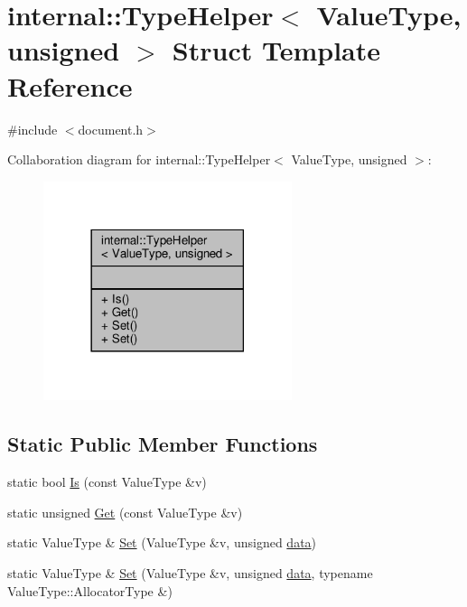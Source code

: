 \hypertarget{structinternal_1_1TypeHelper_3_01ValueType_00_01unsigned_01_4}{}\section{internal\+:\+:Type\+Helper$<$ Value\+Type, unsigned $>$ Struct Template Reference}
\label{structinternal_1_1TypeHelper_3_01ValueType_00_01unsigned_01_4}


{\ttfamily \#include $<$document.\+h$>$}



Collaboration diagram for internal\+:\+:Type\+Helper$<$ Value\+Type, unsigned $>$\+:
\nopagebreak
\begin{figure}[H]
\begin{center}
\leavevmode
\includegraphics[width=206pt]{structinternal_1_1TypeHelper_3_01ValueType_00_01unsigned_01_4__coll__graph}
\end{center}
\end{figure}
\subsection*{Static Public Member Functions}
\begin{DoxyCompactItemize}
\item 
static bool \hyperlink{structinternal_1_1TypeHelper_3_01ValueType_00_01unsigned_01_4_ad1c1cb931ed166508d17e866d410c99b}{Is} (const Value\+Type \&v)
\item 
static unsigned \hyperlink{structinternal_1_1TypeHelper_3_01ValueType_00_01unsigned_01_4_a2f91befe1e9e914e7431b84c0d89f572}{Get} (const Value\+Type \&v)
\item 
static Value\+Type \& \hyperlink{structinternal_1_1TypeHelper_3_01ValueType_00_01unsigned_01_4_a1d960542fd618ac649fe4e045c44f789}{Set} (Value\+Type \&v, unsigned \hyperlink{imgui__impl__opengl3__loader_8h_abd87654504355b4c1bb002dcb1d4d16a}{data})
\item 
static Value\+Type \& \hyperlink{structinternal_1_1TypeHelper_3_01ValueType_00_01unsigned_01_4_a601b05a233b6025486a9105d45d46780}{Set} (Value\+Type \&v, unsigned \hyperlink{imgui__impl__opengl3__loader_8h_abd87654504355b4c1bb002dcb1d4d16a}{data}, typename Value\+Type\+::\+Allocator\+Type \&)
\end{DoxyCompactItemize}


